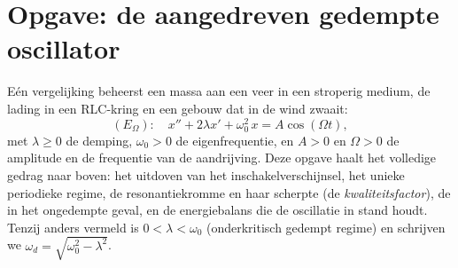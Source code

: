 \section{Opgave: de aangedreven gedempte oscillator}

\begin{problem}\label{pb:b1:diffeq:1}
Eén vergelijking beheerst een massa aan een veer in een stroperig
medium, de lading in een RLC-kring en een gebouw dat in de wind zwaait:
\[
(E_\Omega)\colon\quad
x'' + 2\lambda x' + \omega_0^2\,x = A\cos(\Omega t),
\]
met $\lambda \geq 0$ de demping, $\omega_0 > 0$ de eigenfrequentie, en
$A > 0$ en $\Omega > 0$ de amplitude en de frequentie van de
aandrijving. Deze opgave haalt het volledige gedrag naar boven: het
uitdoven van het inschakelverschijnsel, het unieke periodieke regime, de
resonantiekromme en haar scherpte (de
\emph{kwaliteitsfactor}), de  in het ongedempte geval, en de
energiebalans die de oscillatie in stand
houdt.
Tenzij anders vermeld is $0 < \lambda < \omega_0$ (onderkritisch gedempt
regime) en schrijven we $\omega_d = \sqrt{\omega_0^2 - \lambda^2}$.


\end{problem}
